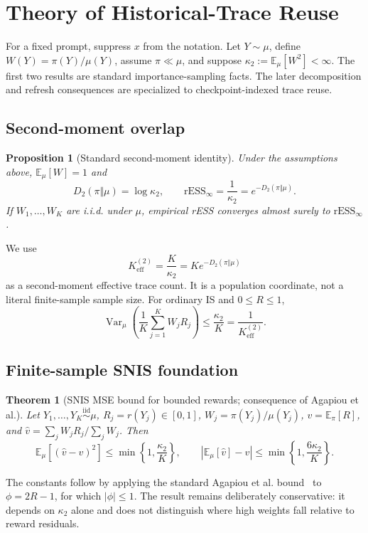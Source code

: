 \documentclass[10pt]{article}
\newtheorem{proposition}{Proposition}
\newtheorem{theorem}{Theorem}
\theoremstyle{remark}
\newcommand{\E}{\mathbb{E}}
\newcommand{\Var}{\operatorname{Var}}
\newcommand{\rESS}{\mathrm{rESS}}
\begin{document}
\section{Theory of Historical-Trace Reuse}
For a fixed prompt, suppress $x$ from the notation. Let $Y\sim\mu$, define $W(Y)=\pi(Y)/\mu(Y)$, assume $\pi\ll\mu$, and suppose $\kappa_2:=\E_\mu[W^2]<\infty$. The first two results are standard importance-sampling facts. The later decomposition and refresh consequences are specialized to checkpoint-indexed trace reuse.

\subsection{Second-moment overlap}
\begin{proposition}[Standard second-moment identity]
Under the assumptions above, $\E_\mu[W]=1$ and
\begin{equation}
D_2(\pi\Vert\mu)=\log\kappa_2,\qquad \rESS_\infty=\frac1{\kappa_2}=e^{-D_2(\pi\Vert\mu)}.
\end{equation}
If $W_1,\ldots,W_K$ are i.i.d. under $\mu$, empirical rESS converges almost surely to $\rESS_\infty$.
\end{proposition}
We use
\begin{equation}
K_{\mathrm{eff}}^{(2)}=\frac{K}{\kappa_2}=Ke^{-D_2(\pi\Vert\mu)}
\end{equation}
as a second-moment effective trace count. It is a population coordinate, not a literal finite-sample sample size. For ordinary IS and $0\le R\le1$,
\begin{equation}
\Var_\mu\!\left(\frac1K\sum_{j=1}^{K}W_jR_j\right)\le \frac{\kappa_2}{K}=\frac1{K_{\mathrm{eff}}^{(2)}}.
\end{equation}

\subsection{Finite-sample SNIS foundation}
\begin{theorem}[SNIS MSE bound for bounded rewards; consequence of Agapiou et al.]
Let $Y_1,\ldots,Y_K\stackrel{\mathrm{iid}}{\sim}\mu$, $R_j=r(Y_j)\in[0,1]$, $W_j=\pi(Y_j)/\mu(Y_j)$, $v=\E_\pi[R]$, and $\widehat v=\sum_jW_jR_j/\sum_jW_j$. Then
\begin{equation}
\E_\mu[(\widehat v-v)^2]\le \min\!\left\{1,\frac{\kappa_2}{K}\right\},\qquad
|\E_\mu[\widehat v]-v|\le \min\!\left\{1,\frac{6\kappa_2}{K}\right\}.
\end{equation}
\end{theorem}
The constants follow by applying the standard Agapiou et al. bound~\cite{agapiou2017} to $\phi=2R-1$, for which $|\phi|\le1$. The result remains deliberately conservative: it depends on $\kappa_2$ alone and does not distinguish where high weights fall relative to reward residuals.
\end{document}
